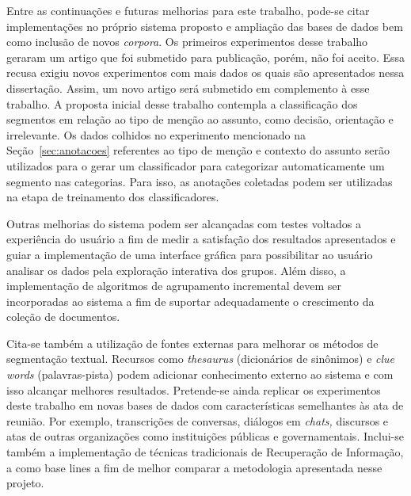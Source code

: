 Entre as continuações e futuras melhorias para este trabalho, pode-se citar implementações no próprio sistema proposto e ampliação das bases de dados bem como inclusão de novos \textit{corpora}.  
%
Os primeiros experimentos desse trabalho geraram um artigo que foi submetido para publicação, porém, não foi aceito. Essa recusa exigiu novos experimentos com mais dados os quais são apresentados nessa dissertação. Assim, um novo artigo será submetido em complemento à esse trabalho.
% 
A proposta inicial desse trabalho contempla a classificação dos segmentos em relação ao tipo de menção ao assunto, como decisão, orientação e irrelevante. Os dados colhidos no experimento mencionado na Seção~\ref{sec:anotacoes} referentes ao tipo de menção e contexto do assunto serão utilizados para o gerar um classificador para categorizar automaticamente um segmento nas categorias. Para isso, as anotações coletadas podem ser utilizadas na etapa de treinamento dos classificadores.

%
Outras melhorias do sistema podem ser alcançadas com testes voltados a experiência do usuário a fim de medir a satisfação dos resultados apresentados e guiar a implementação de uma interface gráfica para possibilitar ao usuário analisar os dados pela exploração interativa dos grupos. Além disso, a implementação de algoritmos de agrupamento incremental devem ser incorporadas ao sistema a fim de suportar adequadamente o crescimento da coleção de documentos.
%

Cita-se também a utilização de fontes externas para melhorar os métodos de segmentação textual. Recursos como \textit{thesaurus} (dicionários de sinônimos) e \textit{clue words} (palavras-pista) podem adicionar conhecimento externo ao sistema e com isso alcançar melhores resultados. 
%
Pretende-se ainda replicar os experimentos deste trabalho em novas bases de dados com características semelhantes às ata de reunião. Por exemplo, transcrições de conversas, diálogos em \textit{chats,} discursos e atas de outras organizações como instituições públicas e governamentais.  
Inclui-se também a implementação de técnicas tradicionais de Recuperação de Informação, a como base lines a fim de melhor comparar a metodologia apresentada nesse projeto. 



















